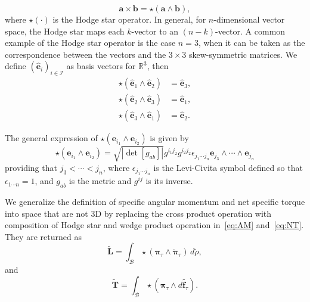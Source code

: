 \documentclass[preprint,12pt]{elsarticle}
\numberwithin{equation}{section}
\renewcommand{\u}[1]{\boldsymbol{#1}}
\renewcommand{\c}[1]{\mathcal{#1}}
\begin{document}
\begin{equation}
\u{a} \times \u{b} = \star(\u a \wedge \u b),
\end{equation}
where $\star(\cdot)$ is the Hodge star operator. In general, for $n$-dimensional vector space, the Hodge star maps each $k$-vector to an $(n - k)$-vector. A common example of the Hodge star operator is the case $n = 3$, when it can be taken as the correspondence between the vectors and the $3\times3$ skew-symmetric matrices. We define $(\hat{\u e}_i)_{i \in \c I}$ as basis vectors for $\mathbb{R}^3$, then
\begin{align*}
\star (\hat{\u e}_1 \wedge \hat{\u e}_2) &= \hat{\u e}_3, \\
\star (\hat{\u e}_2 \wedge \hat{\u e}_3) &= \hat{\u e}_1, \\
\star (\hat{\u e}_3 \wedge \hat{\u e}_1) &= \hat{\u e}_2.
\end{align*}


The general expression of $\star (\u e_{i_1} \wedge \u e_{i_2}) $ is given by 
\begin{equation}
\star (\u e_{i_1} \wedge \u e_{i_2}) = \sqrt{|\det[g_{ab}]|} g^{i_1 j_2}g^{i_2 j_2} \epsilon_{j_1 \cdots j_n} \u e_{j_3} \wedge \cdots \wedge \u e_{j_n} 
\end{equation}
providing that $j_3 < \cdots < j_n$, where $\epsilon_{j_1 \cdots j_n} $ is the Levi-Civita symbol defined so that $\epsilon_{1 \cdots n} = 1$, and $g_{ab}$ is the metric and $g^{ij}$ is its inverse. 

We generalize the definition of specific angular momentum and net specific torque into space that are not 3D by replacing the cross product operation with composition of Hodge star and wedge product operation in~\eqref{eq:AM} and~\eqref{eq:NT}. They are returned as 
\begin{equation}
\label{eq:wAM}
\tilde{\boldsymbol{L}} = \int_{\mathcal{B}} \star\left(\boldsymbol{\pi}_{\tau} \wedge \dot{\boldsymbol{\pi}}_{\tau}\right) \, d\tilde{\rho},
\end{equation}
and
\begin{equation}
\label{eq:wNT}
\tilde{\boldsymbol{T}} = \int_{\mathcal{B}}\star\left( \boldsymbol{\pi}_{\tau} \wedge  d\tilde{\boldsymbol{f}_{\tau}}\right).
\end{equation}
\end{document}
